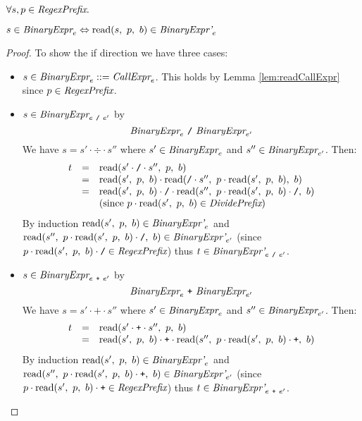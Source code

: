 \documentclass[preprint,10pt]{sigplanconf}
\begin{document}
\begin{lemma}\mbox{}
  
  \( \forall s, p \in \textit{RegexPrefix}. \)
 
  \( s \in \textit{BinaryExpr}_{e} \Leftrightarrow 
  \textrm{read}(s,~p,~b) \in \textit{BinaryExpr'}_{e} \)
\end{lemma}
\begin{proof}
  To show the if direction we have three cases:
  \begin{itemize}
  \item \( s \in \textit{BinaryExpr}_{e} ::=
    \textit{CallExpr}_{e} \). This holds by Lemma
    \ref{lem:readCallExpr} since \( p \in \textit{RegexPrefix} \).

  \item \( s \in \textit{BinaryExpr}_{e~\texttt{/}~e'} \) by 
    \[
    \textit{BinaryExpr}_{e} ~\texttt{/}~ \textit{BinaryExpr}_{e'} 
    \]
    We have \( s = s' \cdot \div \cdot s'' \) where \( s' \in
    \textit{BinaryExpr}_{e} \) and \( s'' \in
    \textit{BinaryExpr}_{e'} \). Then:
    \[
    \begin{array}{rcl}
      t &=& \textrm{read}(s'\cdot \texttt{/} \cdot s'',~p,~b)
      \\
      &=& 
      \textrm{read}(s',~p,~b) \cdot 
      \textrm{read}(\texttt{/} \cdot s'',~
        p \cdot \textrm{read}(s',~p,~b)
      ,~b)
      \\
      &=& \textrm{read}(s',~p,~b) \cdot \texttt{/} \cdot 
      \textrm{read}(s'',~
        p \cdot \textrm{read}(s',~p,~b) \cdot \texttt{/}
      ,~b)
      \\ 
      && \textrm{(since \( p \cdot \textrm{read}(s',~p,~b) \in \textit{DividePrefix}\))}
    \end{array}
    \]
    By induction \( \textrm{read}(s',~p,~b) \in \textit{BinaryExpr'}_{e} \)
    and \( 
      \textrm{read}(s'',~
        p \cdot \textrm{read}(s',~p,~b) \cdot \texttt{/}
      ,~b) \in \textit{BinaryExpr'}_{e'}
      \) (since \( p \cdot \textrm{read}(s',~p,~b) \cdot \texttt{/} \in \textit{RegexPrefix} \)) thus \( t \in \textit{BinaryExpr'}_{e~\texttt{/}~e'} \).

  \item \( s \in \textit{BinaryExpr}_{e~\texttt{+}~e'} \) by 
    \[
    \textit{BinaryExpr}_{e} ~\texttt{+}~ \textit{BinaryExpr}_{e'} 
    \]
    We have \( s = s' \cdot \texttt{+} \cdot s'' \) where \( s' \in
    \textit{BinaryExpr}_{e} \) and \( s'' \in
    \textit{BinaryExpr}_{e'} \). Then:
    \[
    \begin{array}{rcl}
      t &=& \textrm{read}(s'\cdot \texttt{+} \cdot s'',~p,~b)
      \\
      &=& \textrm{read}(s',~p,~b) \cdot \texttt{+} \cdot 
      \textrm{read}(s'',~
        p \cdot \textrm{read}(s',~p,~b) \cdot \texttt{+}
      ,~b)
    \end{array}
    \]
    By induction \( \textrm{read}(s',~p,~b) \in \textit{BinaryExpr'}_{e}
    \) and \( \textrm{read}(s'',~ p \cdot \textrm{read}(s',~p,~b) \cdot \texttt{+}
    ,~b) \in \textit{BinaryExpr'}_{e'} \) (since \( p \cdot
    \textrm{read}(s',~p,~b) \cdot \texttt{+} \in \textit{RegexPrefix} \)) thus \( t \in
    \textit{BinaryExpr'}_{e~\texttt{+}~e'} \).
  \end{itemize}
\end{proof}
\end{document}
